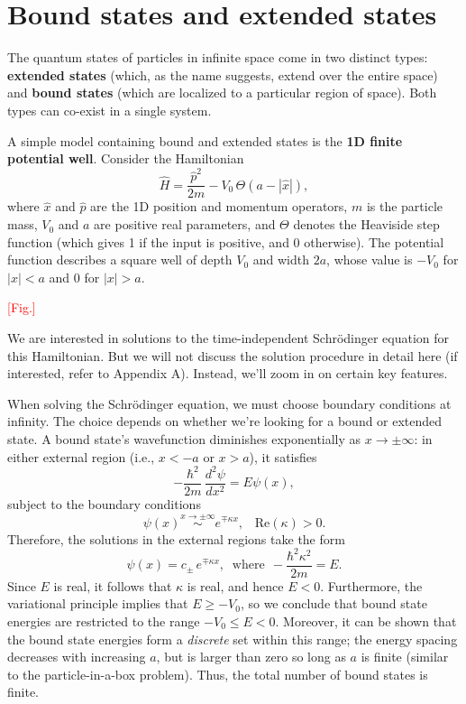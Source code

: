 \documentclass[pra,11pt]{revtex4}
\begin{document}
\section{Bound states and extended states}

The quantum states of particles in infinite space come in two distinct
types: \textbf{extended states} (which, as the name suggests, extend
over the entire space) and \textbf{bound states} (which are localized
to a particular region of space).  Both types can co-exist in a single
system.

A simple model containing bound and extended states is the
\textbf{1D finite potential well}.  Consider the Hamiltonian
$$\hat{H} = \frac{\hat{p}^2}{2m} - V_0 \,\Theta(a -|\hat{x}|),$$
where $\hat{x}$ and $\hat{p}$ are the 1D position and momentum
operators, $m$ is the particle mass, $V_0$ and $a$ are positive real
parameters, and $\Theta$ denotes the Heaviside step function (which
gives 1 if the input is positive, and 0 otherwise).  The potential
function describes a square well of depth $V_0$ and width $2a$, whose
value is $-V_0$ for $|x| < a$ and $0$ for $|x|>a$.

\textcolor{red}{[Fig.]}

We are interested in solutions to the time-independent Schr\"odinger
equation for this Hamiltonian.  But we will not discuss the solution
procedure in detail here (if interested, refer to Appendix A).
Instead, we'll zoom in on certain key features.

When solving the Schr\"odinger equation, we must choose boundary
conditions at infinity.  The choice depends on whether we're looking
for a bound or extended state.  A bound state's wavefunction
diminishes exponentially as $x \rightarrow \pm\infty$: in either
external region (i.e., $x < -a$ or $x > a$), it satisfies
$$-\frac{\hbar^2}{2m}\,\frac{d^2\psi}{dx^2} = E \psi(x),$$
subject to the boundary conditions
$$\psi(x) \overset{x\rightarrow\pm\infty}{\sim} e^{\mp\kappa x}, \;\;\;\mathrm{Re}(\kappa) > 0.$$
Therefore, the solutions in the external regions take the form
$$\psi(x) = c_\pm\, e^{\mp\kappa x}, \;\;\mathrm{where}\;\, -\frac{\hbar^2\kappa^2}{2m} = E.$$
Since $E$ is real, it follows that $\kappa$ is real, and hence $E <
0$.  Furthermore, the variational principle implies that $E \ge -V_0$,
so we conclude that bound state energies are restricted to the range
$-V_0 \le E < 0$.  Moreover, it can be shown that the bound state
energies form a \textit{discrete} set within this range; the energy
spacing decreases with increasing $a$, but is larger than zero so long
as $a$ is finite (similar to the particle-in-a-box problem).  Thus,
the total number of bound states is finite.
\end{document}
